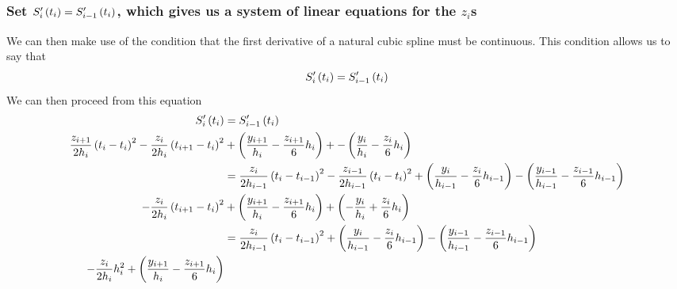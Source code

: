\documentclass[letterpaper, 10pt, titlepage]{article}
\newcommand{\pp}{\paren}
\newcommand{\primed}[1]{^{
    \ifthenelse
    {
        \equal{#1}{0}
    }
    {
    }
    {
        \foreach \x in {1,...,#1}{\prime}}
    }
}
\newcommand{\fs}[3]{\functionof{S_{#1}\primed{#2}}{#3}}
\begin{document}
\subsubsection*{Set $\fs{i}{1}{t_i} = \fs{i-1}{1}{t_i}$, which gives us a system
of linear equations for the $z_i$s}
We can then make use of the condition that the first derivative of a natural
cubic spline must be continuous. This condition allows us to say that
\begin{equation}
    \fs{i}{1}{t_i} = \fs{i-1}{1}{t_i}
\end{equation}
We can then proceed from this equation
\begin{equation}
    \begin{aligned}
        \fs{i}{1}{t_i}
        &=
        \fs{i-1}{1}{t_i}
        \\
        \dfrac{z_{i+1}}{2h_i}\pp{t_i - t_i}^2
        - \dfrac{z_{i}}{2h_i}\pp{t_{i+1} - t_i}^2
        &+ \pp{
            \dfrac{y_{i+1}}{h_i}
            - \dfrac{z_{i+1}}{6}h_i
            }
        + -\pp{\dfrac{y_i}{h_i}
        - \dfrac{z_{i}}{6}h_i}
        \\
        &=
        \dfrac{z_{i}}{2h_{i-1}}\pp{t_i - t_{i - 1}}^2
        - \dfrac{z_{i-1}}{2h_{i-1}}\pp{t_{i} - t_i}^2
        + \pp{
            \dfrac{y_{i}}{h_{i-1}}
            - \dfrac{z_{i}}{6}h_{i-1}
            }
            - \pp{\dfrac{y_{i-1}}{h_{i-1}}
            - \dfrac{z_{i-1}}{6}h_{i-1}}
        \\
        - \dfrac{z_{i}}{2h_i}\pp{t_{i+1} - t_i}^2
        &+ \pp{
            \dfrac{y_{i+1}}{h_i}
            - \dfrac{z_{i+1}}{6}h_i
            }
        + \pp{-\dfrac{y_i}{h_i}
        +\dfrac{z_{i}}{6}h_i}
        \\
        &=
        \dfrac{z_{i}}{2h_{i-1}}\pp{t_i - t_{i - 1}}^2
        + \pp{
            \dfrac{y_{i}}{h_{i-1}}
            - \dfrac{z_{i}}{6}h_{i-1}
            }
            - \pp{\dfrac{y_{i-1}}{h_{i-1}}
            - \dfrac{z_{i-1}}{6}h_{i-1}}
        \\
        - \dfrac{z_{i}}{2h_i}h_i^2
        + \pp{
            \dfrac{y_{i+1}}{h_i}
            - \dfrac{z_{i+1}}{6}h_i
            }

\end{aligned}
\end{equation}
\end{document}
